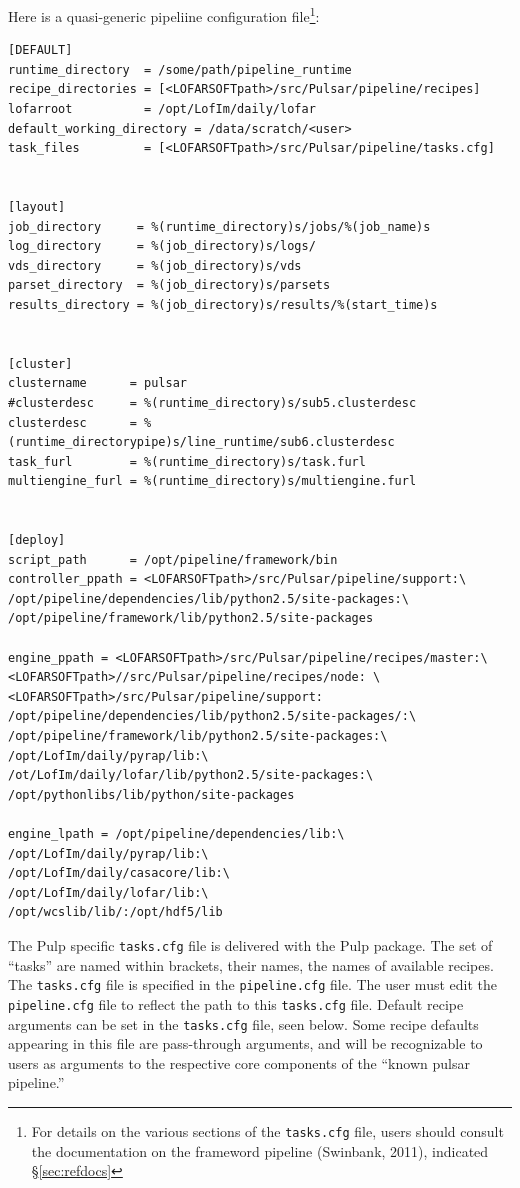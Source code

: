 \documentclass[a4paper,10pt,bibtotoc]{scrartcl}
\begin{document}
Here is a quasi-generic pipeliine configuration file\footnote{For details on the various sections of the \texttt{tasks.cfg} file, users should consult the documentation on the frameword pipeline (Swinbank, 2011), indicated \S \ref{sec:refdocs}}:
\begin{verbatim}
[DEFAULT]
runtime_directory  = /some/path/pipeline_runtime
recipe_directories = [<LOFARSOFTpath>/src/Pulsar/pipeline/recipes]
lofarroot          = /opt/LofIm/daily/lofar
default_working_directory = /data/scratch/<user>
task_files         = [<LOFARSOFTpath>/src/Pulsar/pipeline/tasks.cfg]


[layout]
job_directory     = %(runtime_directory)s/jobs/%(job_name)s
log_directory     = %(job_directory)s/logs/
vds_directory     = %(job_directory)s/vds
parset_directory  = %(job_directory)s/parsets
results_directory = %(job_directory)s/results/%(start_time)s


[cluster]
clustername      = pulsar
#clusterdesc     = %(runtime_directory)s/sub5.clusterdesc
clusterdesc      = %(runtime_directorypipe)s/line_runtime/sub6.clusterdesc
task_furl        = %(runtime_directory)s/task.furl
multiengine_furl = %(runtime_directory)s/multiengine.furl


[deploy]
script_path      = /opt/pipeline/framework/bin
controller_ppath = <LOFARSOFTpath>/src/Pulsar/pipeline/support:\
/opt/pipeline/dependencies/lib/python2.5/site-packages:\
/opt/pipeline/framework/lib/python2.5/site-packages

engine_ppath = <LOFARSOFTpath>/src/Pulsar/pipeline/recipes/master:\
<LOFARSOFTpath>//src/Pulsar/pipeline/recipes/node: \
<LOFARSOFTpath>/src/Pulsar/pipeline/support:
/opt/pipeline/dependencies/lib/python2.5/site-packages/:\
/opt/pipeline/framework/lib/python2.5/site-packages:\
/opt/LofIm/daily/pyrap/lib:\
/ot/LofIm/daily/lofar/lib/python2.5/site-packages:\
/opt/pythonlibs/lib/python/site-packages

engine_lpath = /opt/pipeline/dependencies/lib:\
/opt/LofIm/daily/pyrap/lib:\
/opt/LofIm/daily/casacore/lib:\
/opt/LofIm/daily/lofar/lib:\
/opt/wcslib/lib/:/opt/hdf5/lib

\end{verbatim}

The Pulp specific \verb|tasks.cfg| file is delivered with the Pulp
package. The set of  ``tasks'' are named within brackets, their names,
the names of available recipes.  The \verb|tasks.cfg| file is
specified in the \verb|pipeline.cfg| file. The user must edit the \verb|pipeline.cfg| file to reflect the path to this \verb|tasks.cfg| file. Default recipe arguments can be set in the \verb|tasks.cfg| file, seen below.  Some recipe defaults appearing in this file are pass-through arguments, and will be recognizable to users as arguments to the respective core components of the ``known pulsar pipeline.''
\end{document}
